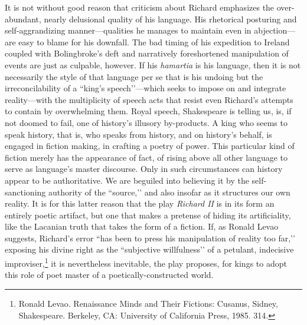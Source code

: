 It is not without good reason that criticism about Richard emphasizes the over-abundant, nearly delusional quality of his language.
His rhetorical posturing and self-aggrandizing manner---qualities he manages to maintain even in abjection---are easy to blame for his downfall.
The bad timing of his expedition to Ireland coupled with Bolingbroke’s deft and narratively foreshortened manipulation of events are just as culpable, however.
If his \emph{hamartia} is his language, then it is not necessarily the style of that language per se that is his undoing but the irreconcilability of a ``king’s speech’’---which seeks to impose on and integrate reality---with the multiplicity of speech acts that resist even Richard’s attempts to contain by overwhelming them.
Royal speech, Shakespeare is telling us, is, if not doomed to fail, one of history’s illusory by-products.
A king who seems to speak history, that is, who speaks from history, and on history’s behalf, is engaged in fiction making, in crafting a poetry of power.
This particular kind of fiction merely has the appearance of fact, of rising above all other language to serve as language’s master discourse.
Only in such circumstances can history appear to be authoritative.
We are beguiled into believing it by the self-sanctioning authority of the ``source,’’ and also insofar as it structures our own reality.
It is for this latter reason that the play \emph{Richard II} is in its form an entirely poetic artifact, but one that makes a pretense of hiding its artificiality, like the Lacanian truth that takes the form of a fiction.
If, as Ronald Levao suggests, Richard’s error ``has been to press his manipulation of reality too far,’’ exposing his divine right as the ``subjective willfulness’’ of a petulant, indecisive improviser,\footnote{Ronald Levao. Renaissance Minds and Their Fictions: Cusanus, Sidney, Shakespeare.
Berkeley, CA: University of California Press, 1985. 314.} it is nevertheless inevitable, the play proposes, for kings to adopt this role of poet master of a poetically-constructed world.

